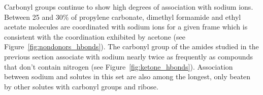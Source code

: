 \documentclass[journal=jpcbfk,manuscript=article]{achemso}
\begin{document}
  
  Carbonyl groups continue to show high degrees of association with
  sodium ions. Between 25 and 30\% of propylene carbonate, dimethyl 
  formamide and ethyl acetate molecules are coordinated with sodium ions
  for a given frame which is consistent with the coordination exhibited by acetone
  (see Figure~\ref{fig:nondonors_hbonds}). The carbonyl group of the amides 
  studied in the previous section associate with sodium nearly twice as 
  frequently as compounds that don't contain nitrogen 
  (see Figure~\ref{fig:ketone_hbonds}).
  Association between sodium and solutes in this set are also among the longest,
  only beaten by other solutes with carbonyl groups and ribose.
 
\end{document}

